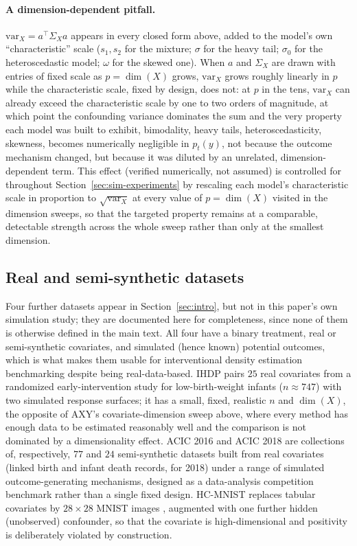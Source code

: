 \documentclass[11pt]{article}
\theoremstyle{plain}
\theoremstyle{definition}
\theoremstyle{remark}
\begin{document}
\paragraph{A dimension-dependent pitfall.} $\mathrm{var}_X =
a^\top\Sigma_X a$ appears in every closed form above, added to the model's own ``characteristic''
scale ($s_1,s_2$ for the mixture; $\sigma$ for the heavy tail; $\sigma_0$ for the heteroscedastic
model; $\omega$ for the skewed one). When $a$ and $\Sigma_X$ are drawn with entries of fixed scale
as $p=\dim(X)$ grows, $\mathrm{var}_X$ grows roughly linearly in $p$ while the characteristic
scale, fixed by design, does not: at $p$ in the tens, $\mathrm{var}_X$ can already exceed the
characteristic scale by one to two orders of magnitude, at which point the confounding variance
dominates the sum and the very property each model was built to exhibit, bimodality, heavy
tails, heteroscedasticity, skewness, becomes numerically negligible in $p_t(y)$, not because the
outcome mechanism changed, but because it was diluted by an unrelated, dimension-dependent term.
This effect (verified numerically, not assumed) is controlled for throughout
Section~\ref{sec:sim-experiments} by rescaling each model's characteristic scale in proportion to
$\sqrt{\mathrm{var}_X}$ at every value of $p=\dim(X)$ visited in the dimension sweeps, so that the
targeted property remains at a comparable, detectable strength across the whole sweep rather than
only at the smallest dimension.

\subsection{Real and semi-synthetic datasets}
\label{app:dgp-real}

Four further datasets appear in Section~\ref{sec:intro}, but not in this paper's own
simulation study; they are documented here for completeness, since none of them
is otherwise defined in the main text. All four have a binary treatment, real or semi-synthetic
covariates, and simulated (hence known) potential outcomes, which is what makes them usable for
interventional density estimation benchmarking despite being real-data-based. IHDP \citep{hill2011ihdp} pairs $25$ real
covariates from a randomized early-intervention study for low-birth-weight infants
($n\approx 747$) with two simulated response surfaces; it has a small, fixed, realistic
$n$ and $\dim(X)$, the opposite of AXY's covariate-dimension sweep above, where every method has
enough data to be estimated reasonably well and the comparison is not dominated by a
dimensionality effect. ACIC 2016 \citep{dorie2019acic2016} and
ACIC 2018 \citep{shimoni2018acic2018} are collections of, respectively, $77$ and $24$
semi-synthetic datasets built from real covariates (linked birth and infant death records, for
2018) under a range of simulated outcome-generating mechanisms, designed as a data-analysis
competition benchmark rather than a single fixed design. HC-MNIST \citep{jesson2021hcmnist}
replaces tabular covariates by $28\times 28$ MNIST images \citep{lecun1998mnist}, augmented with
one further hidden (unobserved) confounder, so that the covariate is high-dimensional and
positivity is deliberately violated by construction.
\end{document}
